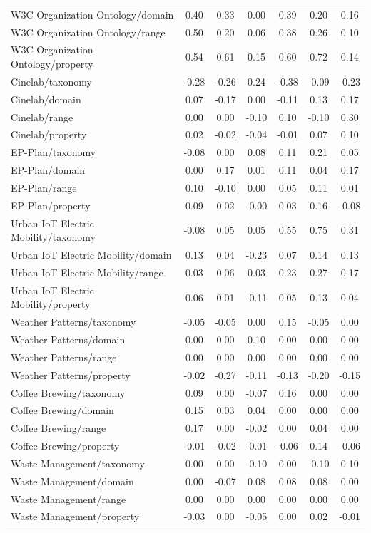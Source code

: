 \begin{tabular}{lcccccc}
W3C Organization Ontology/domain & 0.40 & 0.33 & 0.00 & 0.39 & 0.20 & 0.16 \\
W3C Organization Ontology/range & 0.50 & 0.20 & 0.06 & 0.38 & 0.26 & 0.10 \\
W3C Organization Ontology/property & 0.54 & 0.61 & 0.15 & 0.60 & 0.72 & 0.14 \\
Cinelab/taxonomy & -0.28 & -0.26 & 0.24 & -0.38 & -0.09 & -0.23 \\
Cinelab/domain & 0.07 & -0.17 & 0.00 & -0.11 & 0.13 & 0.17 \\
Cinelab/range & 0.00 & 0.00 & -0.10 & 0.10 & -0.10 & 0.30 \\
Cinelab/property & 0.02 & -0.02 & -0.04 & -0.01 & 0.07 & 0.10 \\
EP-Plan/taxonomy & -0.08 & 0.00 & 0.08 & 0.11 & 0.21 & 0.05 \\
EP-Plan/domain & 0.00 & 0.17 & 0.01 & 0.11 & 0.04 & 0.17 \\
EP-Plan/range & 0.10 & -0.10 & 0.00 & 0.05 & 0.11 & 0.01 \\
EP-Plan/property & 0.09 & 0.02 & -0.00 & 0.03 & 0.16 & -0.08 \\
Urban IoT Electric Mobility/taxonomy & -0.08 & 0.05 & 0.05 & 0.55 & 0.75 & 0.31 \\
Urban IoT Electric Mobility/domain & 0.13 & 0.04 & -0.23 & 0.07 & 0.14 & 0.13 \\
Urban IoT Electric Mobility/range & 0.03 & 0.06 & 0.03 & 0.23 & 0.27 & 0.17 \\
Urban IoT Electric Mobility/property & 0.06 & 0.01 & -0.11 & 0.05 & 0.13 & 0.04 \\
Weather Patterns/taxonomy & -0.05 & -0.05 & 0.00 & 0.15 & -0.05 & 0.00 \\
Weather Patterns/domain & 0.00 & 0.00 & 0.10 & 0.00 & 0.00 & 0.00 \\
Weather Patterns/range & 0.00 & 0.00 & 0.00 & 0.00 & 0.00 & 0.00 \\
Weather Patterns/property & -0.02 & -0.27 & -0.11 & -0.13 & -0.20 & -0.15 \\
Coffee Brewing/taxonomy & 0.09 & 0.00 & -0.07 & 0.16 & 0.00 & 0.00 \\
Coffee Brewing/domain & 0.15 & 0.03 & 0.04 & 0.00 & 0.00 & 0.00 \\
Coffee Brewing/range & 0.17 & 0.00 & -0.02 & 0.00 & 0.04 & 0.00 \\
Coffee Brewing/property & -0.01 & -0.02 & -0.01 & -0.06 & 0.14 & -0.06 \\
Waste Management/taxonomy & 0.00 & 0.00 & -0.10 & 0.00 & -0.10 & 0.10 \\
Waste Management/domain & 0.00 & -0.07 & 0.08 & 0.08 & 0.08 & 0.00 \\
Waste Management/range & 0.00 & 0.00 & 0.00 & 0.00 & 0.00 & 0.00 \\
Waste Management/property & -0.03 & 0.00 & -0.05 & 0.00 & 0.02 & -0.01 \\
\bottomrule
\end{tabular}
